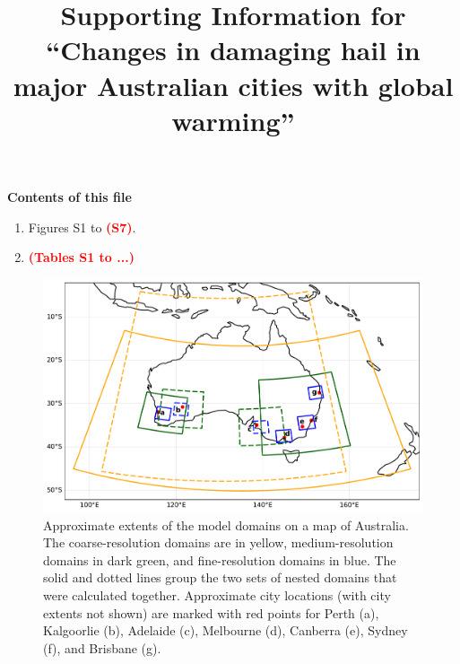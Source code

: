 \documentclass[draft,grl]{agutexSI2019}
\newcommand*{\todo}[1]{\textbf{\textcolor{red}{(#1)}}}
\begin{document}
\title{Supporting Information for ``Changes in damaging hail in major Australian cities with global warming''}



\begin{article}

\noindent\textbf{Contents of this file}
\begin{enumerate}
    \item Figures S1 to \todo{S7}.
    \item \todo{Tables S1 to ...}
\end{enumerate}

\clearpage



\end{article}

\clearpage

\begin{figure}[!h]
    \includegraphics[width=\textwidth]{figures/domains}
    \caption{Approximate extents of the model domains on a map of Australia. The coarse-resolution domains are in yellow, medium-resolution domains in dark green, and fine-resolution domains in blue. The solid and dotted lines group the two sets of nested domains that were calculated together. Approximate city locations (with city extents not shown) are marked with red points for Perth (a), Kalgoorlie (b), Adelaide (c), Melbourne (d), Canberra (e), Sydney (f), and Brisbane (g).}
    \label{fig:domains}
\end{figure}
\end{document}
